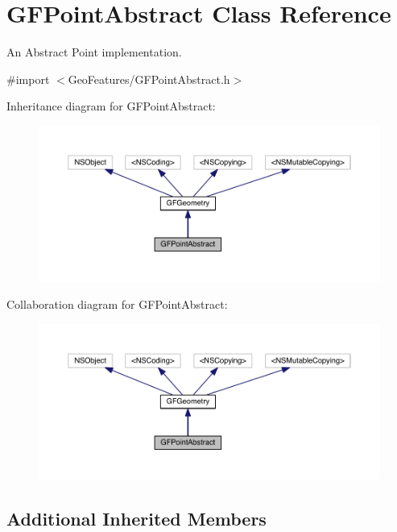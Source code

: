 \hypertarget{interface_g_f_point_abstract}{}\section{G\+F\+Point\+Abstract Class Reference}
\label{interface_g_f_point_abstract}


An Abstract Point implementation.  




{\ttfamily \#import $<$Geo\+Features/\+G\+F\+Point\+Abstract.\+h$>$}



Inheritance diagram for G\+F\+Point\+Abstract\+:\nopagebreak
\begin{figure}[H]
\begin{center}
\leavevmode
\includegraphics[width=350pt]{interface_g_f_point_abstract__inherit__graph}
\end{center}
\end{figure}


Collaboration diagram for G\+F\+Point\+Abstract\+:\nopagebreak
\begin{figure}[H]
\begin{center}
\leavevmode
\includegraphics[width=350pt]{interface_g_f_point_abstract__coll__graph}
\end{center}
\end{figure}
\subsection*{Additional Inherited Members}


